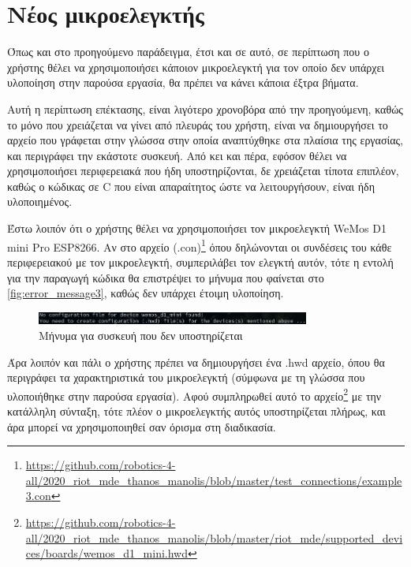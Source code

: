 \section{Νέος μικροελεγκτής}
\label{sec:example3}

Όπως και στο προηγούμενο παράδειγμα, έτσι και σε αυτό, σε περίπτωση που ο χρήστης θέλει να χρησιμοποιήσει κάποιον μικροελεγκτή για τον οποίο δεν υπάρχει υλοποίηση στην παρούσα εργασία, θα πρέπει να κάνει κάποια έξτρα βήματα.

Αυτή η περίπτωση επέκτασης, είναι λιγότερο χρονοβόρα από την προηγούμενη, καθώς το μόνο που χρειάζεται να γίνει από πλευράς του χρήστη, είναι να δημιουργήσει το αρχείο που γράφεται στην γλώσσα στην οποία αναπτύχθηκε στα πλαίσια της εργασίας, και περιγράφει την εκάστοτε συσκευή. Από κει και πέρα, εφόσον θέλει να χρησιμοποιήσει περιφερειακά που ήδη υποστηρίζονται, δε χρειάζεται τίποτα επιπλέον, καθώς ο κώδικας σε C που είναι απαραίτητος ώστε να λειτουργήσουν, είναι ήδη υλοποιημένος.

Έστω λοιπόν ότι ο χρήστης θέλει να χρησιμοποιήσει τον μικροελεγκτή WeMos D1 mini Pro ESP8266. Αν στο αρχείο (.con)\footnote{\url{https://github.com/robotics-4-all/2020_riot_mde_thanos_manolis/blob/master/test_connections/example3.con}} όπου δηλώνονται οι συνδέσεις του κάθε περιφερειακού με τον μικροελεγκτή, συμπεριλάβει τον ελεγκτή αυτόν, τότε η εντολή για την παραγωγή κώδικα θα επιστρέψει το μήνυμα που φαίνεται στο \autoref{fig:error_message3}, καθώς δεν υπάρχει έτοιμη υλοποίηση.

\begin{figure}[!ht]
	\centering
	\includegraphics[width=0.8\textwidth]{./images/chapter6/error_message3.png}
	\caption{Μήνυμα για συσκευή που δεν υποστηρίζεται}
	\label{fig:error_message3}
\end{figure}

Άρα λοιπόν και πάλι ο χρήστης πρέπει να δημιουργήσει ένα .hwd αρχείο, όπου θα περιγράφει τα χαρακτηριστικά του μικροελεγκτή (σύμφωνα με τη γλώσσα που υλοποιήθηκε στην παρούσα εργασία). Αφού συμπληρωθεί αυτό το αρχείο\footnote{\url{https://github.com/robotics-4-all/2020_riot_mde_thanos_manolis/blob/master/riot_mde/supported_devices/boards/wemos_d1_mini.hwd}} με την κατάλληλη σύνταξη, τότε πλέον ο μικροελεγκτής αυτός υποστηρίζεται πλήρως, και άρα μπορεί να χρησιμοποιηθεί σαν όρισμα στη διαδικασία.